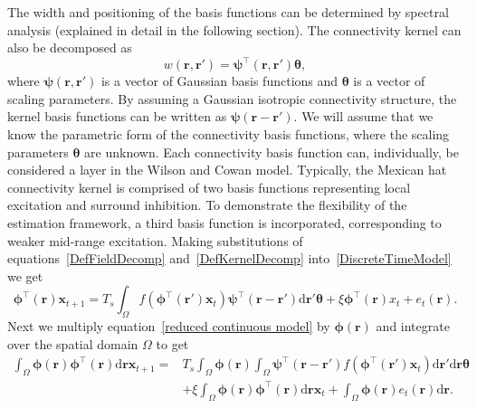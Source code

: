 \documentclass[10pt]{article}
\begin{document}
The width and positioning of the basis functions can be determined by spectral analysis (explained in detail in the following section). The connectivity kernel can also be decomposed as 
\begin{equation}\label{DefKernelDecomp}
	 w\left(\mathbf{r},\mathbf{r}'\right) =\boldsymbol{\psi}^\top\left(\mathbf{r},\mathbf{r}'\right) \boldsymbol{\theta},
\end{equation}
where $\boldsymbol{\psi}(\mathbf{r},\mathbf{r}')$ is a vector of Gaussian basis functions and $\boldsymbol{\theta}$ is a vector of scaling parameters. By assuming a Gaussian isotropic connectivity structure, the kernel basis functions can be written as $\boldsymbol{\psi}(\mathbf{r}-\mathbf{r}')$. We will assume that we know the parametric form of the connectivity basis functions, where the scaling parameters $\boldsymbol{\theta}$ are unknown. Each connectivity basis function can, individually, be considered a layer in the Wilson and Cowan model. Typically, the Mexican hat connectivity kernel is comprised of two basis functions representing local excitation and surround inhibition. To demonstrate the flexibility of the estimation framework, a third basis function is incorporated, corresponding to weaker mid-range excitation. Making substitutions of equations~\ref{DefFieldDecomp} and~\ref{DefKernelDecomp} into~\ref{DiscreteTimeModel} we get 
\begin{equation}
	\label{reduced continuous model}
	\boldsymbol{\phi}^{\top}(\mathbf{r})\mathbf{x}_{t+1}= T_s\int_\Omega{f(\boldsymbol{\phi}^{\top}(\mathbf{r}')\mathbf{x}_t )\boldsymbol{\psi}^{\top}(\mathbf{r}-\mathbf{r}')\textrm{d}\mathbf{r}'}\boldsymbol{\theta}
	+ \xi\boldsymbol{\phi}^{\top}(\mathbf{r})x_t + e_t(\mathbf{r}). 
\end{equation}
Next we multiply equation~\ref{reduced continuous model} by $\boldsymbol{\phi}(\mathbf{r})$ and integrate over the spatial domain $\Omega$ to get 
\begin{equation}
    \begin{split}
	\label{StartofReduction}
 	\int_\Omega {\boldsymbol{\phi} \left(\mathbf{r}\right)\boldsymbol{\phi}^{\top}\left(\mathbf{r}\right) \textrm{d}\mathbf{r}} \mathbf{x}_{t+1}= &
 T_s \int_\Omega {\boldsymbol{\phi} (\mathbf{r}) \int_\Omega {\boldsymbol{\psi}^{\top} (\mathbf{r}-\mathbf{r}') f(\boldsymbol{\phi}^{\top}(\mathbf{r}') \mathbf{x}_t ) \textrm{d}\mathbf{r}'}\textrm{d}\mathbf{r}}\boldsymbol{\theta}  \\ 
& + \xi\int_\Omega {\boldsymbol{\phi}(\mathbf{r})\boldsymbol{\phi}^{\top}(\mathbf{r})\textrm{d}\mathbf{r}} \mathbf{x}_t +
\int_\Omega{\boldsymbol{\phi} (\mathbf{r}) e_t(\mathbf{r})\textrm{d}\mathbf{r}}. 
\end{split}
\end{equation}
\end{document}
